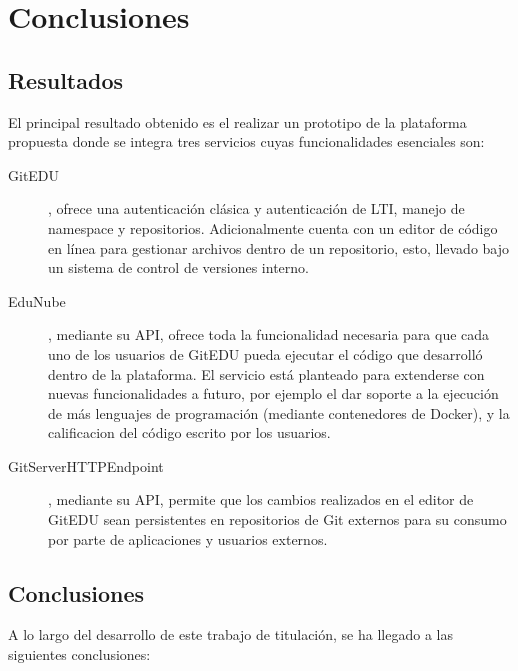 
\chapter{Conclusiones}
\label{capitulo7}

\section{Resultados}
El principal resultado obtenido es el realizar un prototipo de la plataforma propuesta donde se integra tres servicios cuyas funcionalidades esenciales son:
\begin{description}
	\item[GitEDU], ofrece una autenticación clásica y autenticación de LTI, manejo de namespace y repositorios. Adicionalmente cuenta con un editor de código en línea para gestionar archivos dentro de un repositorio, esto, llevado bajo un sistema de control de versiones interno.
    \item[EduNube], mediante su API, ofrece toda la funcionalidad necesaria para que cada uno de los usuarios de GitEDU pueda ejecutar el código que desarrolló dentro de la plataforma. El servicio está planteado para extenderse con nuevas funcionalidades a futuro, por ejemplo el dar soporte a la ejecución de más lenguajes de programación (mediante contenedores de Docker), y la calificacion del código escrito por los usuarios.
    \item[GitServerHTTPEndpoint], mediante su API, permite que los cambios realizados en el editor de GitEDU sean persistentes en repositorios de Git externos para su consumo por parte de aplicaciones y usuarios externos.
\end{description}


\section{Conclusiones}
A lo largo del desarrollo de este trabajo de titulación, se ha llegado a las siguientes conclusiones:

